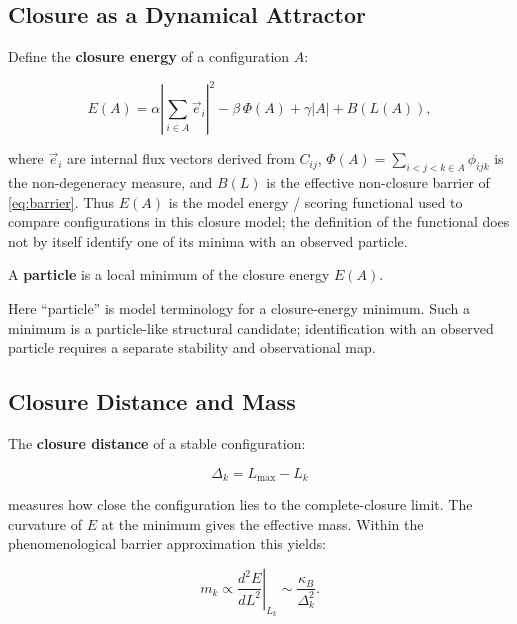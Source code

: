 \subsection{Closure as a Dynamical Attractor}

Define the \textbf{closure energy} of a configuration $A$:

\begin{equation}
  E(A)
  = \alpha\left|\sum_{i\in A}\vec{e}_i\right|^2
  - \beta\,\Phi(A)
  + \gamma|A|
  + B(L(A)),
  \label{eq:closure_energy}
\end{equation}

where $\vec{e}_i$ are internal flux vectors derived from $C_{ij}$,
$\Phi(A) = \sum_{i<j<k\in A}\phi_{ijk}$ is the non-degeneracy measure,
and $B(L)$ is the effective non-closure barrier of \cref{eq:barrier}.
Thus $E(A)$ is the model energy / scoring functional used to compare
configurations in this closure model; the definition of the functional does
not by itself identify one of its minima with an observed particle.

\begin{definition}
A \textbf{particle} is a local minimum of the closure energy $E(A)$.
\end{definition}

Here ``particle'' is model terminology for a closure-energy minimum.  Such a
minimum is a particle-like structural candidate; identification with an
observed particle requires a separate stability and observational map.

\subsection{Closure Distance and Mass}

The \textbf{closure distance} of a stable configuration:

\begin{equation}
  \Delta_k = L_{\max} - L_k
  \label{eq:delta}
\end{equation}

measures how close the configuration lies to the complete-closure limit.
The curvature of $E$ at the minimum gives the effective mass.
Within the phenomenological barrier approximation this yields:

\begin{keybox}
\begin{equation}
  m_k
  \propto \left.\frac{d^2 E}{dL^2}\right|_{L_k}
  \sim \frac{\kappa_B}{\Delta_k^2}.
  \label{eq:mass}
\end{equation}
\end{keybox}

